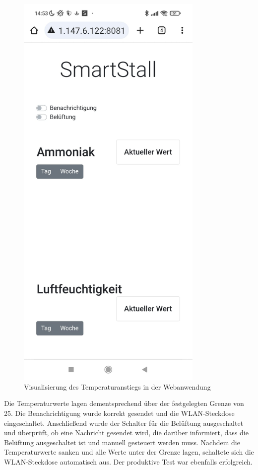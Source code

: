 \documentclass[conference]{IEEEtran}
\begin{document}
\begin{figure}[H]
	\centering
	\includegraphics[width=90mm]{fig/anstiegTemperatur.jpg}
	\caption{Visualisierung des Temperaturanstiegs in der Webanwendung}
	\label{webanwendungtest}
\end{figure}

Die Temperaturwerte lagen dementsprechend über der festgelegten Grenze von 25. Die Benachrichtigung wurde korrekt gesendet und die WLAN-Steckdose eingeschaltet. Anschließend wurde der Schalter für die Belüftung ausgeschaltet und überprüft, ob eine Nachricht gesendet wird, die darüber informiert, dass die Belüftung ausgeschaltet ist und manuell gesteuert werden muss. Nachdem die Temperaturwerte sanken und alle Werte unter der Grenze lagen, schaltete sich die WLAN-Steckdose automatisch aus. Der produktive Test war ebenfalls erfolgreich.
\end{document}
